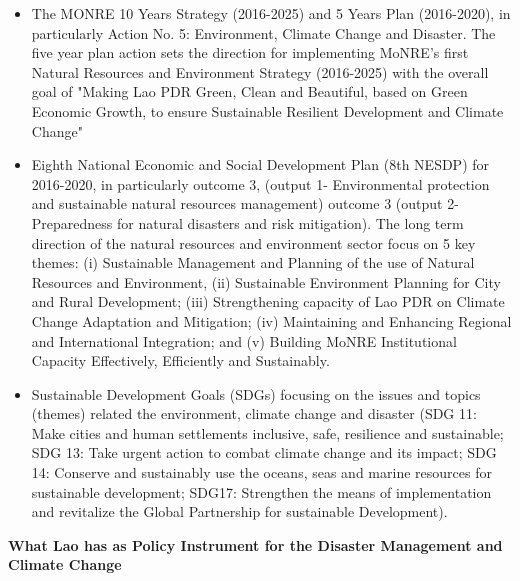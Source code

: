 \begin{itemize}

\item The MONRE 10 Years Strategy (2016-2025) and 5 Years Plan (2016-2020), in particularly Action No. 5: Environment, Climate Change and Disaster. The five year plan action sets the direction for implementing MoNRE's first Natural Resources and Environment Strategy (2016-2025) with the overall goal of "Making Lao PDR Green, Clean and Beautiful, based on Green Economic Growth, to ensure Sustainable Resilient Development and Climate Change" 
\item Eighth National Economic and Social Development Plan (8th NESDP) for 2016-2020, in particularly outcome 3, (output 1- Environmental protection and sustainable natural resources management) outcome 3 (output 2- Preparedness for natural disasters and risk mitigation). The long term direction of the natural resources and environment sector focus on 5 key themes: (i) Sustainable Management and Planning of the use of Natural Resources and Environment, (ii) Sustainable Environment Planning for City and Rural Development; (iii) Strengthening capacity of Lao PDR on Climate Change Adaptation and Mitigation; (iv) Maintaining and Enhancing Regional and International Integration; and (v) Building MoNRE Institutional Capacity Effectively, Efficiently and Sustainably.
\item Sustainable Development Goals (SDGs) focusing on the issues and topics (themes) related the environment, climate change and disaster (SDG 11: Make cities and human settlements inclusive, safe, resilience and sustainable; SDG 13: Take urgent action to combat climate change and its impact; SDG 14: Conserve and sustainably use the oceans, seas and marine resources for sustainable development; SDG17: Strengthen the means of implementation and revitalize the Global Partnership for sustainable Development).

\end{itemize}

{\flushleft \large \bfseries What Lao has as Policy Instrument for the Disaster Management and Climate Change}

